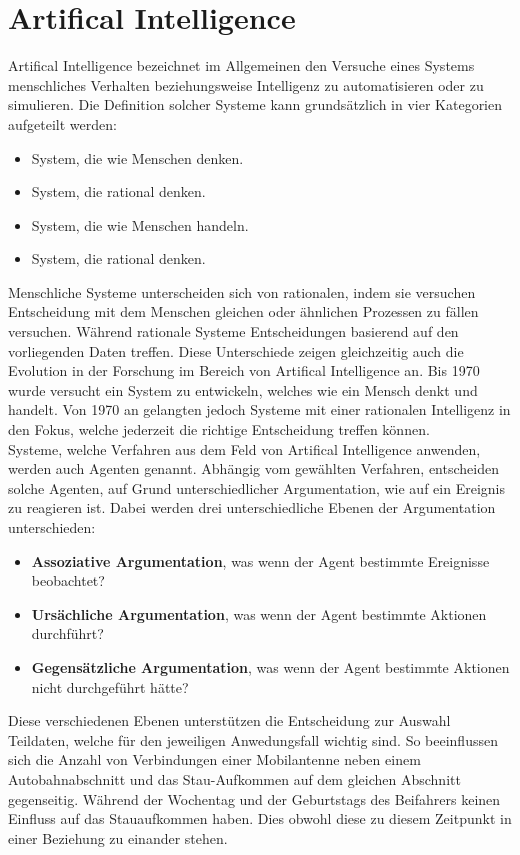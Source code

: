 \section{\gls{Artifical Intelligence}}
\gls{Artifical Intelligence} bezeichnet im Allgemeinen den Versuche eines Systems menschliches Verhalten beziehungsweise Intelligenz zu automatisieren oder zu simulieren. Die Definition solcher Systeme kann grundsätzlich in vier Kategorien aufgeteilt werden: 
\begin{itemize}
    \item System, die wie Menschen denken.\\
    \item System, die rational denken.\\
    \item System, die wie Menschen handeln.\\
    \item System, die rational denken.\\
\end{itemize}
Menschliche Systeme unterscheiden sich von rationalen, indem sie versuchen Entscheidung mit dem Menschen gleichen oder ähnlichen Prozessen zu fällen versuchen. Während rationale Systeme Entscheidungen basierend auf den vorliegenden Daten treffen. Diese Unterschiede zeigen gleichzeitig auch die Evolution in der Forschung im Bereich von \gls{Artifical Intelligence} an. Bis 1970 wurde versucht ein System zu entwickeln, welches wie ein Mensch denkt und handelt. Von 1970 an gelangten jedoch Systeme mit einer rationalen Intelligenz in den Fokus, welche jederzeit die richtige Entscheidung treffen können.\\
Systeme, welche Verfahren aus dem Feld von \gls{Artifical Intelligence} anwenden, werden auch Agenten genannt. Abhängig vom gewählten Verfahren, entscheiden solche Agenten, auf Grund unterschiedlicher Argumentation, wie auf ein Ereignis zu reagieren ist. Dabei werden drei unterschiedliche Ebenen der Argumentation unterschieden:
\begin{itemize}
    \item \textbf{Assoziative Argumentation}, was wenn der Agent bestimmte Ereignisse beobachtet?\\
    \item \textbf{Ursächliche Argumentation}, was wenn der Agent bestimmte Aktionen durchführt?\\
    \item \textbf{Gegensätzliche Argumentation}, was wenn der Agent bestimmte Aktionen nicht durchgeführt hätte?\\
\end{itemize}
Diese verschiedenen Ebenen unterstützen die Entscheidung zur Auswahl Teildaten, welche für den jeweiligen Anwedungsfall wichtig sind.
So beeinflussen sich die Anzahl von Verbindungen einer Mobilantenne neben einem Autobahnabschnitt und das Stau-Aufkommen auf dem gleichen Abschnitt gegenseitig. Während der Wochentag und der Geburtstags des Beifahrers keinen Einfluss auf das Stauaufkommen haben. Dies obwohl diese zu diesem Zeitpunkt in einer Beziehung zu einander stehen.\\
\cite{Russell:2009:AIM:1671238}
